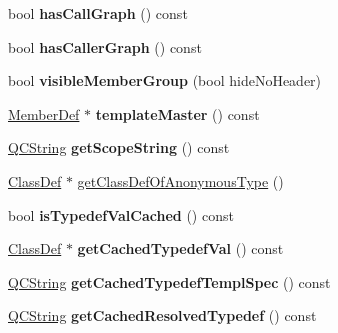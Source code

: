 \begin{DoxyCompactItemize}
\item 
\hypertarget{class_member_def_adbba13949f96dc1f71d3440e59bc3a9a}{bool {\bfseries has\-Call\-Graph} () const }\label{class_member_def_adbba13949f96dc1f71d3440e59bc3a9a}

\item 
\hypertarget{class_member_def_aef0ec53bbc5da5eebdb53daaad7a0b65}{bool {\bfseries has\-Caller\-Graph} () const }\label{class_member_def_aef0ec53bbc5da5eebdb53daaad7a0b65}

\item 
\hypertarget{class_member_def_a0061c7443420efd7c6f683d9b70e2b3f}{bool {\bfseries visible\-Member\-Group} (bool hide\-No\-Header)}\label{class_member_def_a0061c7443420efd7c6f683d9b70e2b3f}

\item 
\hypertarget{class_member_def_af101fe3cd3ad71dfedac32479fe11087}{\hyperlink{class_member_def}{Member\-Def} $\ast$ {\bfseries template\-Master} () const }\label{class_member_def_af101fe3cd3ad71dfedac32479fe11087}

\item 
\hypertarget{class_member_def_a5c845a148f8120b99a833fd743c7f117}{\hyperlink{class_q_c_string}{Q\-C\-String} {\bfseries get\-Scope\-String} () const }\label{class_member_def_a5c845a148f8120b99a833fd743c7f117}

\item 
\hyperlink{class_class_def}{Class\-Def} $\ast$ \hyperlink{class_member_def_a8abd06d384175121e4076ecc16648631}{get\-Class\-Def\-Of\-Anonymous\-Type} ()
\item 
\hypertarget{class_member_def_aaf069ecb320e1a19dc290b83e561844f}{bool {\bfseries is\-Typedef\-Val\-Cached} () const }\label{class_member_def_aaf069ecb320e1a19dc290b83e561844f}

\item 
\hypertarget{class_member_def_a1cdcdf786c3cea05f388a675aa98e170}{\hyperlink{class_class_def}{Class\-Def} $\ast$ {\bfseries get\-Cached\-Typedef\-Val} () const }\label{class_member_def_a1cdcdf786c3cea05f388a675aa98e170}

\item 
\hypertarget{class_member_def_ae261cff57024cf9a1279eaacb2cbf1c3}{\hyperlink{class_q_c_string}{Q\-C\-String} {\bfseries get\-Cached\-Typedef\-Templ\-Spec} () const }\label{class_member_def_ae261cff57024cf9a1279eaacb2cbf1c3}

\item 
\hypertarget{class_member_def_a21bd550e666b32616d8cd868ec16d3aa}{\hyperlink{class_q_c_string}{Q\-C\-String} {\bfseries get\-Cached\-Resolved\-Typedef} () const }\label{class_member_def_a21bd550e666b32616d8cd868ec16d3aa}


\end{DoxyCompactItemize}
